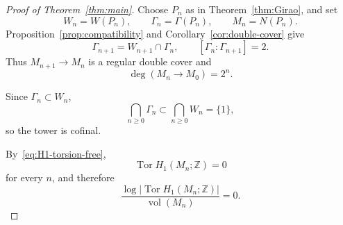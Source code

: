 \documentclass[10pt,a4paper]{amsart}
\newcommand{\Tor}{\operatorname{Tor}}
\newcommand{\ZZ}{\mathbb Z}
\newcommand{\vol}{\operatorname{vol}}
\begin{document}
\begin{proof}[Proof of Theorem~\ref{thm:main}]
Choose $P_n$ as in Theorem~\ref{thm:Girao}, and set
\[
  W_n=W(P_n),
  \qquad
  \Gamma_n=\Gamma(P_n),
  \qquad
  M_n=N(P_n).
\]
Proposition~\ref{prop:compatibility} and Corollary~\ref{cor:double-cover} give
\[
  \Gamma_{n+1}=W_{n+1}\cap\Gamma_n,
  \qquad
  [\Gamma_n:\Gamma_{n+1}]=2.
\]
Thus $M_{n+1}\to M_n$ is a regular double cover and
\begin{equation}\label{eq:degree}
  \deg(M_n\to M_0)=2^n.
\end{equation}

Since $\Gamma_n\subset W_n$,
\[
  \bigcap_{n\geq0}\Gamma_n
  \subset
  \bigcap_{n\geq0}W_n
  =\{1\},
\]
so the tower is cofinal.

By~\eqref{eq:H1-torsion-free},
\[
  \Tor H_1(M_n;\ZZ)=0
\]
for every $n$, and therefore
\[
  \frac{\log |\Tor H_1(M_n;\ZZ)|}{\vol(M_n)}=0.
\]

\end{proof}
\end{document}
